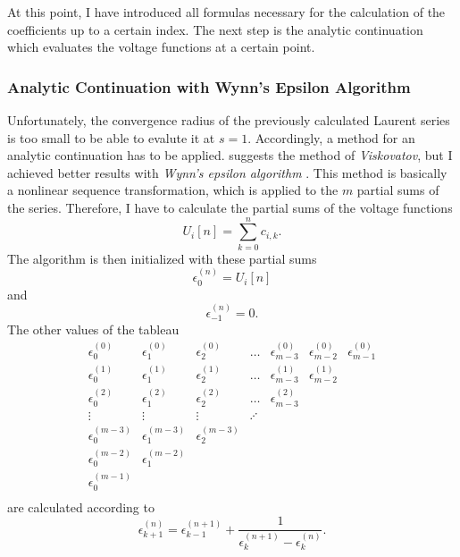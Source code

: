 At this point, I have introduced all formulas necessary for the calculation of the coefficients up to a certain index. The next step is the analytic continuation which evaluates the voltage functions at a certain point.

\subsubsection{Analytic Continuation with Wynn's Epsilon Algorithm}

Unfortunately, the convergence radius of the previously calculated Laurent series is too small to be able to evalute it at $s = 1$. Accordingly, a method for an analytic continuation has to be applied. \citep{helmPatentSept2009} suggests the method of \emph{Viskovatov}, but I achieved better results with \emph{Wynn's epsilon algorithm} \citep{epsilonWynn}. This method is basically a nonlinear sequence transformation, which is applied to the $m$ partial sums of the series. Therefore, I have to calculate the partial sums of the voltage functions
\begin{equation}
	U_i[n] = \sum_{k = 0}^n c_{i,k}.
\end{equation}
The algorithm is then initialized with these partial sums
\begin{equation}
	\epsilon_0^{(n)} = U_i[n]
\end{equation}
and
\begin{equation}
	\epsilon_{-1}^{(n)} = 0.
\end{equation}
The other values of the tableau
\begin{equation}
	\begin{matrix}
	\epsilon_0^{(0)}	& \epsilon_1^{(0)}		& \epsilon_2^{(0)}		& \hdots 	& \epsilon_{m-3}^{(0)} 	& \epsilon_{m-2}^{(0)} 	& \epsilon_{m-1}^{(0)} \\
	\epsilon_0^{(1)}	& \epsilon_1^{(1)}		& \epsilon_2^{(1)}		& \hdots 	& \epsilon_{m-3}^{(1)} 	& \epsilon_{m-2}^{(1)} \\
	\epsilon_0^{(2)}	& \epsilon_1^{(2)}		& \epsilon_2^{(2)}		& \hdots 	& \epsilon_{m-3}^{(2)} \\
	\vdots				& \vdots				& \vdots				& \iddots \\
	\epsilon_0^{(m-3)}	& \epsilon_1^{(m-3)}	& \epsilon_2^{(m-3)}	& \\
	\epsilon_0^{(m-2)}	& \epsilon_1^{(m-2)} \\
	\epsilon_0^{(m-1)} \\
	\end{matrix}
	\label{eq:epsilon_wynn_tableau}
\end{equation}
are calculated according to
\begin{equation}
	\epsilon_{k + 1}^{(n)} = \epsilon_{k - 1}^{(n + 1)} + \frac{1}{\epsilon_{k}^{(n + 1)} - \epsilon_{k}^{(n)}}.
	\label{eq:epsilon_wynn}
\end{equation}

